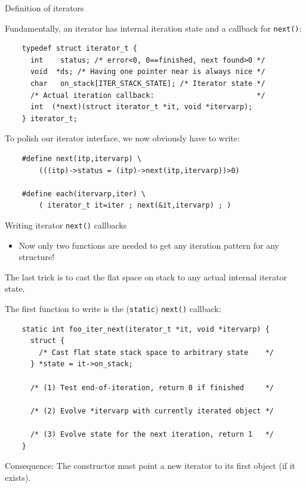 \begin{frame}[fragile]{Definition of iterators}

  Fundamentally, an iterator has internal iteration state and a callback for \lstinline{next()}:
  \begin{lstlisting}
    typedef struct iterator_t {
      int    status; /* error<0, 0==finished, next found>0 */
      void  *ds; /* Having one pointer near is always nice */
      char   on_stack[ITER_STACK_STATE]; /* Iterator state */
      /* Actual iteration callback:                        */
      int  (*next)(struct iterator_t *it, void *itervarp);
    } iterator_t;
  \end{lstlisting}

  To polish our iterator interface, we now obviously have to write:
  \begin{lstlisting}
    #define next(itp,itervarp) \
        (((itp)->status = (itp)->next(itp,itervarp))>0)
    
    #define each(itervarp,iter) \
        ( iterator_t it=iter ; next(&it,itervarp) ; )
  \end{lstlisting}
  

\end{frame}


\begin{frame}[fragile]{Writing iterator \lstinline{next()} callbacks}

  \begin{itemize}
  \item Now only two functions are needed to get any iteration pattern for any structure!
  \end{itemize}
  The last trick is to cast the flat space on stack to any actual internal iterator state.

  The first function to write is the (\lstinline{static}) \lstinline{next()} callback:
  
  \begin{lstlisting}
    static int foo_iter_next(iterator_t *it, void *itervarp) {
      struct {
        /* Cast flat state stack space to arbitrary state    */
      } *state = it->on_stack; 

      /* (1) Test end-of-iteration, return 0 if finished     */

      /* (2) Evolve *itervarp with currently iterated object */

      /* (3) Evolve state for the next iteration, return 1   */
    }
  \end{lstlisting}

  Consequence: The constructor must point a new iterator to its first object (if it exists).
  
\end{frame}


